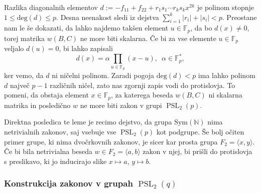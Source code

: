 \begin{dokaz}
Razlika diagonalnih elementov $d := -f_{11} + f_{22} + r_1 s_1 \cdots r_k s_k x^{2k}$ je polinom stopnje $1 \le \text{deg}(d) \le p$. Desna neenakost sledi iz dejstva
$\sum_{i = 1}^{k} \lvert r_i \rvert + \lvert s_i \rvert < p$. Preostane nam le še dokazati, da lahko najdemo takšen element $u \in \mathbb{F}_p$, da bo $d(x) \neq 0$, torej matrika $w(B, C)$ ne more biti skalarna.
Če bi za vse elemente $u \in \mathbb{F}_p$ veljalo $d(u) = 0$, bi lahko zapisali 
\begin{equation*}
    d(x) = \alpha \prod_{u \in  \mathbb{F}_p} (x - u), \,\,\, \alpha \in \mathbb{F}_p^{*},
\end{equation*}  
ker vemo, da $d$ ni ničelni polinom. Zaradi pogoja $\text{deg} (d) < p$ ima lahko polinom $d$ največ $p - 1$ različnih ničel, zato nas zgornji zapis vodi do protislovja.
To pomeni, da obstaja element $x \in \mathbb{F}_p$, za katerega beseda $w(B, C)$ ni skalarna matrika in posledično $w$ ne more biti zakon v grupi $\operatorname{PSL}_2(p)$. 
\end{dokaz}

    Direktna posledica te leme je recimo dejstvo, da grupa $\text{Sym}(\mathbb{N})$ nima netrivialnih zakonov, saj vsebuje vse $\operatorname{PSL}_2(p)$ kot podgrupe.
    Še bolj očiten primer grupe, ki nima dvočrkovnih zakonov, je sicer kar prosta grupa $F_2 = \langle x , y \rangle$. Če bi bila netrivialna beseda $w \in F_2 = \langle a , b \rangle$ zakon v njej,
    bi prišli do protislovja s preslikavo, ki jo inducirajo slike $x \mapsto a$, $y \mapsto b$.
    

    \subsubsection{Konstrukcija zakonov v grupah $\operatorname{PSL}_2(q)$}

